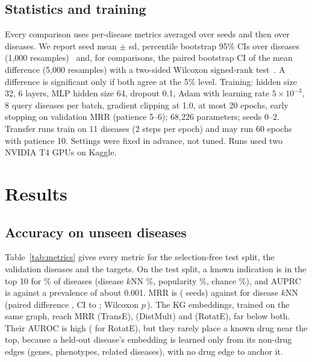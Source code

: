 \documentclass{ieeeaccess}
\begin{document}
\subsection{Statistics and training}
Every comparison uses per-disease metrics averaged over seeds and then over diseases. We report seed mean $\pm$ sd, percentile bootstrap 95\% CIs over diseases (1,000 resamples)~\cite{efron1993bootstrap} and, for comparisons, the paired bootstrap CI of the mean difference (5,000 resamples) with a two-sided Wilcoxon signed-rank test~\cite{wilcoxon1945}. A difference is significant only if both agree at the 5\% level. Training: hidden size 32, 6 layers, MLP hidden size 64, dropout 0.1, Adam with learning rate $5\times10^{-3}$, 8 query diseases per batch, gradient clipping at 1.0, at most 20 epochs, early stopping on validation MRR (patience 5--6); 68,226 parameters; seeds 0--2. Transfer runs train on 11 diseases (2 steps per epoch) and may run 60 epochs with patience 10. Settings were fixed in advance, not tuned. Runs used two NVIDIA T4 GPUs on Kaggle.

\section{Results}
\label{sec:results}
\subsection{Accuracy on unseen diseases}
\label{sec:aim2}
Table~\ref{tab:metrics} gives every metric for the selection-free test split, the validation diseases and the targets. On the test split, a known indication is in the top 10 for \TabModelTestAnyTen\% of diseases (disease $k$NN \TabKnnTestAnyTen\%, popularity \TabPopTestAnyTen\%, chance \RandExpAnyTenTest\%), and AUPRC is \TabModelTestAuprc{} against a prevalence of about 0.001. MRR is \TestMrr{} (\TestSeeds{} seeds) against \KnnTestMrr{} for disease $k$NN (paired difference \DiffTestKnn, CI \DiffLoTestKnn{} to \DiffHiTestKnn; Wilcoxon $p$\,\PwilTestKnn). The KG embeddings, trained on the same graph, reach MRR \KgeTranseTestMrr{} (TransE), \KgeDistmultTestMrr{} (DistMult) and \KgeRotateTestMrr{} (RotatE), far below both. Their AUROC is high (\KgeRotateTestAuroc{} for RotatE), but they rarely place a known drug near the top, because a held-out disease's embedding is learned only from its non-drug edges (genes, phenotypes, related diseases), with no drug edge to anchor it.
\end{document}
